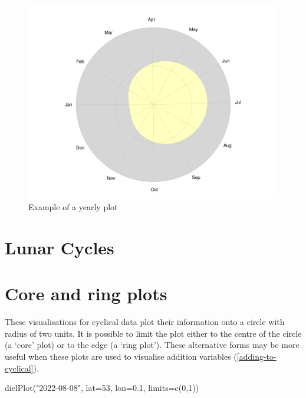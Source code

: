\documentclass[
]{book}
\newenvironment{Shaded}{\begin{snugshade}}{\end{snugshade}}
\newcommand{\AttributeTok}[1]{\textcolor[rgb]{0.77,0.63,0.00}{#1}}
\newcommand{\DecValTok}[1]{\textcolor[rgb]{0.00,0.00,0.81}{#1}}
\newcommand{\FloatTok}[1]{\textcolor[rgb]{0.00,0.00,0.81}{#1}}
\newcommand{\FunctionTok}[1]{\textcolor[rgb]{0.00,0.00,0.00}{#1}}
\newcommand{\NormalTok}[1]{#1}
\newcommand{\StringTok}[1]{\textcolor[rgb]{0.31,0.60,0.02}{#1}}
\begin{document}
\begin{figure}

{\centering \includegraphics[width=0.9\linewidth]{_main_files/figure-latex/yearly-plot-1-1} 

}

\caption{Example of a yearly plot}\label{fig:yearly-plot-1}
\end{figure}

\hypertarget{lunar-cycles}{%
\section{Lunar Cycles}\label{lunar-cycles}}

\hypertarget{core-and-ring-plots}{%
\section{Core and ring plots}\label{core-and-ring-plots}}

These visualisations for cyclical data plot their information onto a circle with radius of two units. It is possible to limit the plot either to the centre of the circle (a `core' plot) or to the edge (a `ring plot'). These alternative forms may be more useful when these plots are used to visualise addition variables (\ref{adding-to-cyclical}).

\begin{Shaded}
\begin{Highlighting}[]
\FunctionTok{dielPlot}\NormalTok{(}\StringTok{"2022{-}08{-}08"}\NormalTok{, }\AttributeTok{lat=}\DecValTok{53}\NormalTok{, }\AttributeTok{lon=}\FloatTok{0.1}\NormalTok{, }\AttributeTok{limits=}\FunctionTok{c}\NormalTok{(}\DecValTok{0}\NormalTok{,}\DecValTok{1}\NormalTok{))}
\end{Highlighting}
\end{Shaded}
\end{document}
